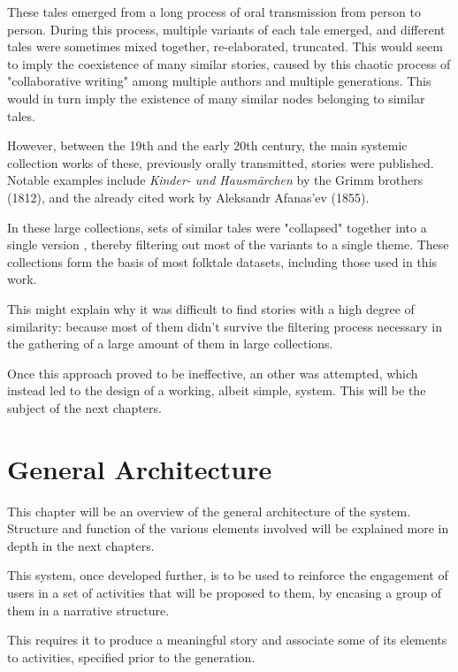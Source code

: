 \documentclass[12pt,a4paper,oneside]{report}
\begin{document}
\begin{itemize}
These tales emerged from a long process of oral transmission from person to person. During this process, multiple variants of each tale emerged, and different tales were sometimes mixed together, re-elaborated, truncated. This would seem to imply the coexistence of many similar stories, caused by this chaotic process of "collaborative writing" among multiple authors and multiple generations. This would in turn imply the existence of many similar nodes belonging to similar tales.

However, between the 19th and the early 20th century, the main systemic collection works of these, previously orally transmitted, stories were published. Notable examples include \textit{Kinder- und Hausmärchen} by the Grimm brothers (1812), and the already cited work by Aleksandr Afanas'ev (1855).

In these large collections, sets of similar tales were "collapsed" together into a single version \cite{propp}, thereby filtering out most of the variants to a single theme. These collections form the basis of most folktale datasets, including those used in this work. 

\bigskip

This might explain why it was difficult to find stories with a high degree of similarity: because most of them didn't survive the filtering process necessary in the gathering of a large amount of them in large collections.
\end{itemize}

\bigskip

Once this approach proved to be ineffective, an other was attempted, which instead led to the design of a working, albeit simple, system. This will be the subject of the next chapters.

\pagebreak

\chapter{General Architecture}
This chapter will be an overview of the general architecture of the system. Structure and function of the various elements involved will be explained more in depth in the next chapters. 

\bigskip

This system, once developed further, is to be used to reinforce the engagement of users in a set of activities that will be proposed to them, by encasing a group of them in a narrative structure.

This requires it to produce a meaningful story and associate some of its elements to activities, specified prior to the generation.
\end{document}
